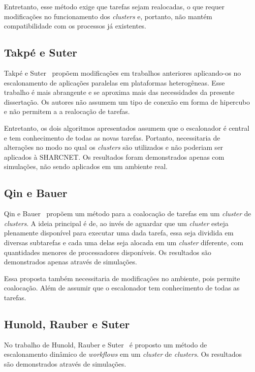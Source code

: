 \documentclass[12pt]{report} %
\begin{document}
	    Entretanto, esse método exige que tarefas sejam realocadas, o que requer modificações no funcionamento dos \textit{clusters} e, portanto, não mantém compatibilidade com os processos já existentes.

	\subsection{Takpé e Suter}
	    Takpé e Suter~\cite{Suter07} propõem modificações em trabalhos anteriores aplicando-os no escalonamento de aplicações paralelas em plataformas heterogêneas.
	    Esse trabalho é mais abrangente e se aproxima mais das necessidades da presente dissertação.
	    Os autores não assumem um tipo de conexão em forma de hipercubo e não permitem a a realocação de tarefas.
	    
	    Entretanto, os dois algoritmos apresentados assumem que o escalonador é central e tem conhecimento de todas as novas tarefas.
	    Portanto, necessitaria de alterações no modo no qual os \textit{clusters} são utilizados e não poderiam ser aplicados à SHARCNET.
	    Os resultados foram demonstrados apenas com simulações, não sendo aplicados em um ambiente real.

	\subsection{Qin e Bauer}
	    Qin e Bauer~\cite{Bauer07} propõem um método para a coalocação de tarefas em um \textit{cluster} de \textit{clusters}.
	    A ideia principal é de, ao invés de aguardar que um \textit{cluster} esteja plenamente disponível para executar uma dada tarefa, essa seja dividida em diversas subtarefas e cada uma delas seja alocada em um \textit{cluster} diferente, com quantidades menores de processadores disponíveis.
	    Os resultados são demonstrados apenas através de simulações.

	    Essa proposta também necessitaria de modificações no ambiente, pois permite coalocação.
	    Além de assumir que o escalonador tem conhecimento de todas as tarefas.

	\subsection{Hunold, Rauber e Suter}
	    No trabalho de Hunold, Rauber e Suter~\cite{Rauber08} é proposto um método de escalonamento dinâmico de \textit{workflows} em um \textit{cluster} de \textit{clusters}.
	    Os resultados são demonstrados através de simulações.
\end{document}
